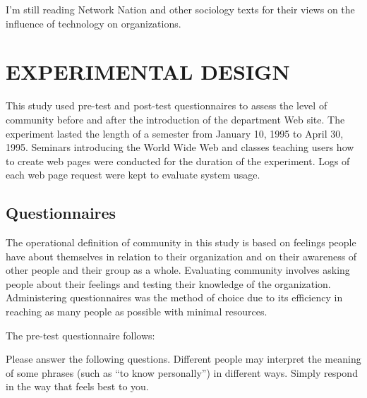 I'm still reading Network Nation and other sociology texts for their views on
the influence of technology on organizations.

\section{EXPERIMENTAL DESIGN}

This study used pre-test and post-test questionnaires to assess the level of
community before and after the introduction of the department Web site.  The
experiment lasted the length of a semester from January 10, 1995 to April 30,
1995.  Seminars introducing the World Wide Web and classes teaching users how
to create web pages were conducted for the duration of the experiment.  Logs of
each web page request were kept to evaluate system usage.

\subsection{Questionnaires}
The operational definition of community in this study is based on feelings
people have about themselves in relation to their organization and on their
awareness of other people and their group as a whole.  Evaluating community
involves asking people about their feelings and testing their knowledge of the
organization.  Administering questionnaires was the method of choice due to its
efficiency in reaching as many people as possible with minimal resources.  

The pre-test questionnaire follows:

Please answer the following questions.  Different people may interpret the
meaning of some phrases (such as ``to know personally'') in different
ways. Simply respond in the way that feels best to you.

